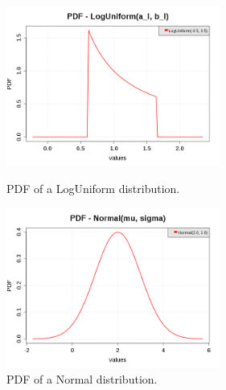 \begin{figure}[H]
  \begin{minipage}{10cm}
    \begin{center}
      \includegraphics[width=7cm]{pdf_LogUniform.png}
      \caption{PDF of a  LogUniform distribution.}
      \label{PDFLogUniform}
    \end{center}
  \end{minipage}
  \hfill
  \begin{minipage}{10cm}
    \begin{center}
      \includegraphics[width=7cm]{pdf_Normal.png}
      \caption{PDF of a Normal distribution.}
      \label{PDFNormal}
    \end{center}
  \end{minipage}
\end{figure}



